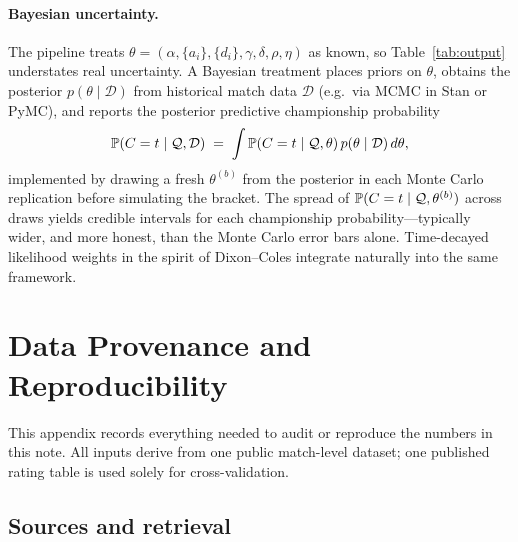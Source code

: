 \paragraph{Bayesian uncertainty.}
The pipeline treats $\theta = (\alpha, \{a_i\}, \{d_i\}, \gamma, \delta,
\rho, \eta)$ as known, so Table~\ref{tab:output} understates real
uncertainty. A Bayesian treatment places priors on $\theta$, obtains the
posterior $p(\theta \mid \mathcal{D})$ from historical match data
$\mathcal{D}$ (e.g.\ via MCMC in Stan or PyMC), and reports the posterior
predictive championship probability
\begin{equation}
\mathbb{P}(C = t \mid \mathcal{Q}, \mathcal{D})
\;=\;
\int \mathbb{P}(C = t \mid \mathcal{Q}, \theta)\,
p(\theta \mid \mathcal{D})\, d\theta,
\label{eq:posteriorpredictive}
\end{equation}
implemented by drawing a fresh $\theta^{(b)}$ from the posterior in each
Monte Carlo replication before simulating the bracket. The spread of
$\mathbb{P}(C = t \mid \mathcal{Q}, \theta^{(b)})$ across draws yields credible
intervals for each championship probability---typically wider, and more
honest, than the Monte Carlo error bars alone. Time-decayed likelihood
weights in the spirit of Dixon--Coles integrate naturally into the same
framework.

\section{Data Provenance and Reproducibility}
\label{app:repro}

This appendix records everything needed to audit or reproduce the numbers in
this note. All inputs derive from one public match-level dataset; one
published rating table is used solely for cross-validation.

\subsection{Sources and retrieval}
\label{app:sources}

